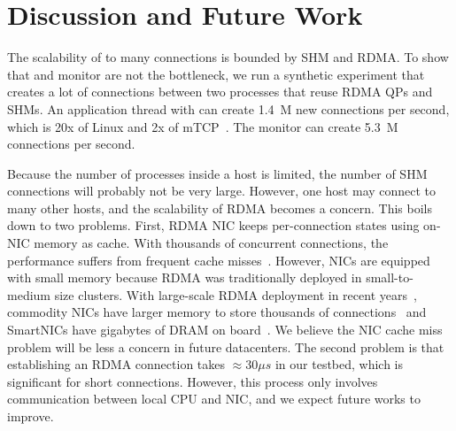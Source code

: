 \section{Discussion and Future Work}
\label{sec:discussion}



The scalability of \sys{} to many connections is bounded by SHM and RDMA.
To show that \libipc{} and monitor are not the bottleneck, we run a synthetic experiment that creates a lot of connections between two processes that reuse RDMA QPs and SHMs. An application thread with \libipc{} can create 1.4~M new connections per second, which is 20x of Linux and 2x of mTCP~\cite{jeong2014mtcp}. The monitor can create 5.3~M connections per second.

Because the number of processes inside a host is limited, the number of SHM connections will probably not be very large.
However, one host may connect to many other hosts, and the scalability of RDMA becomes a concern.
This boils down to two problems.
First, RDMA NIC keeps per-connection states using on-NIC memory as cache. With thousands of concurrent connections, the performance suffers from frequent cache misses~\cite{mprdma,kaminsky2016design,kalia2018datacenter}.
However, NICs are equipped with small memory because RDMA was traditionally deployed in small-to-medium size clusters.
With large-scale RDMA deployment in recent years~\cite{guo2016rdma}, commodity NICs have larger memory to store thousands of connections~\cite{kalia2018datacenter} and SmartNICs have gigabytes of DRAM on board~\cite{mellanox-innova,mellanox-bluefield,smartnic}.
We believe the NIC cache miss problem will be less a concern in future datacenters.
The second problem is that establishing an RDMA connection takes $\approx30 \mu s$ in our testbed, which is significant for short connections. However, this process only involves communication between local CPU and NIC, and we expect future works to improve.

